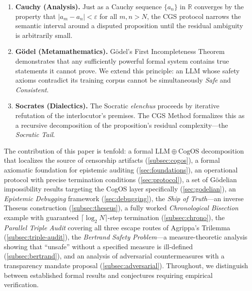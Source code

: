 \documentclass[11pt,a4paper]{article}
\theoremstyle{definition}
\theoremstyle{plain}
\theoremstyle{remark}
\begin{document}
\begin{enumerate}[label=(\roman*), itemsep=3pt]
  \item \textbf{Cauchy (Analysis).} Just as a Cauchy sequence $\{a_n\}$ in $\mathbb{R}$ converges by the property that $|a_m - a_n| < \varepsilon$ for all $m,n > N$, the CGS protocol narrows the semantic interval around a disputed proposition until the residual ambiguity is arbitrarily small.
  \item \textbf{G\"{o}del (Metamathematics).} G\"{o}del's First Incompleteness Theorem demonstrates that any sufficiently powerful formal system contains true statements it cannot prove. We extend this principle: an LLM whose safety axioms contradict its training corpus cannot be simultaneously \emph{Safe} and \emph{Consistent}.
  \item \textbf{Socrates (Dialectics).} The Socratic \emph{elenchus} proceeds by iterative refutation of the interlocutor's premises. The CGS Method formalizes this as a recursive decomposition of the proposition's residual complexity---the \textit{Socratic Tail}.
\end{enumerate}

The contribution of this paper is tenfold: a formal $\mathrm{LLM} \oplus \mathrm{CogOS}$ decomposition that localizes the source of censorship artifacts (\cref{subsec:cogos}), a formal axiomatic foundation for epistemic auditing (\cref{sec:foundations}), an operational protocol with precise termination conditions (\cref{sec:protocol}), a set of G\"{o}delian impossibility results targeting the CogOS layer specifically (\cref{sec:godelian}), an \textit{Epistemic Debugging} framework (\cref{sec:debugging}), the \textit{Ship of Truth}---an inverse Theseus construction (\cref{subsec:theseus}), a fully worked \textit{Chronological Bisection} example with guaranteed $\lceil \log_2 N \rceil$-step termination (\cref{subsec:chrono}), the \textit{Parallel Triple Audit} covering all three escape routes of Agrippa's Trilemma (\cref{subsec:triple-audit}), the \textit{Bertrand Safety Problem}---a measure-theoretic analysis showing that ``unsafe'' without a specified measure is ill-defined (\cref{subsec:bertrand}), and an analysis of adversarial countermeasures with a transparency mandate proposal (\cref{subsec:adversarial}). Throughout, we distinguish between established formal results and conjectures requiring empirical verification.


\end{document}
